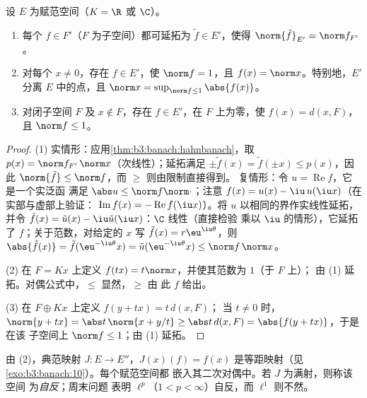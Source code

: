 \begin{corollary}\label{cor:b3:banach:hbnormed}
设 $E$ 为赋范空间（$K = \R$ 或 $\C$）。
\begin{enumerate}
  \item 每个 $f \in F'$（$F$ 为子空间）都可延拓为 $\tilde f
        \in E'$，使得 $\norm{\tilde f}_{E'} = \norm f_{F'}$。
  \item 对每个 $x \neq 0$，存在 $f \in E'$，使 $\norm f
        = 1$，且 $f(x) = \norm x$。特别地，$E'$ 分离
        $E$ 中的点，且 $\norm x = \sup_{\norm f \leq
        1}\abs{f(x)}$。
  \item 对闭子空间 $F$ 及 $x \notin F$，存在 $f
        \in E'$，在 $F$ 上为零，使 $f(x) = d(x, F)$，
        且 $\norm f \leq 1$。
\end{enumerate}
\end{corollary}

\begin{proof}
(1) 实情形：应用\cref{thm:b3:banach:hahnbanach}，取 $p(x)
= \norm f_{F'}\,\norm x$（次线性）；延拓满足
$\pm\tilde f(x) = \tilde f(\pm x) \leq p(x)$，因此
$\norm{\tilde f} \leq \norm f$，而 $\geq$ 则由限制直接得到。
复情形：令 $u = \operatorname{Re}f$，它是一个实泛函
满足 $\abs u \leq \norm f\norm\cdot$；注意 $f(x) = u(x) -
\iu\,u(\iu x)$（在实部与虚部上验证：
$\operatorname{Im}f(x) = -\operatorname{Re}f(\iu x)$）。将
$u$ 以相同的界作实线性延拓，并令 $\tilde f(x) =
\tilde u(x) - \iu\tilde u(\iu x)$：$\C$ 线性（直接检验
乘以 $\iu$ 的情形），它延拓了 $f$；关于范数，对给定的 $x$
写 $\tilde f(x) = r\eu^{\iu\theta}$，则 $\abs{\tilde f(x)}
= \tilde f(\eu^{-\iu\theta}x) = \tilde u(\eu^{-\iu\theta}x)
\leq \norm f\,\norm x$。

(2) 在 $F = Kx$ 上定义 $f(tx) = t\norm x$，并使其范数为 $1$（于 $F$ 上）；
由 (1) 延拓。对偶公式中，$\leq$ 显然，$\geq$ 由
此 $f$ 给出。

(3) 在 $F \oplus Kx$ 上定义 $f(y + tx) = t\,d(x, F)$；
当 $t \neq 0$ 时，$\norm{y + tx} = \abs t\,\norm{x + y/t} \geq \abs
t\,d(x, F) = \abs{f(y + tx)}$，于是在该
子空间上 $\norm f \leq 1$；由 (1) 延拓。
\end{proof}

\begin{remark}\label{rem:b3:banach:bidual}
由 (2)，典范映射 $J \colon E \to E''$，$J(x)(f) =
f(x)$ 是等距映射（见\cref{exo:b3:banach:10}）。每个赋范空间都
嵌入其二次对偶中。若 $J$ 为满射，则称该空间
为\emph{自反}；周末问题
表明 $\ell^p$（$1 < p < \infty$）自反，而
$\ell^1$ 则不然。
\end{remark}

